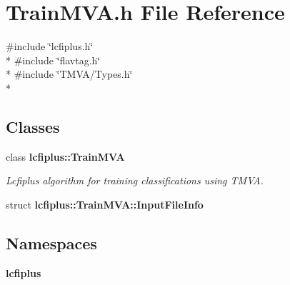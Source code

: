 \section{Train\-M\-V\-A.\-h File Reference}
\label{TrainMVA_8h}
{\ttfamily \#include \char`\"{}lcfiplus.\-h\char`\"{}}\\*
{\ttfamily \#include \char`\"{}flavtag.\-h\char`\"{}}\\*
{\ttfamily \#include \char`\"{}T\-M\-V\-A/\-Types.\-h\char`\"{}}\\*
\subsection*{Classes}
\begin{DoxyCompactItemize}
\item 
class {\bf lcfiplus\-::\-Train\-M\-V\-A}
\begin{DoxyCompactList}\small\item\em Lcfiplus algorithm for training classifications using T\-M\-V\-A. \end{DoxyCompactList}\item 
struct {\bf lcfiplus\-::\-Train\-M\-V\-A\-::\-Input\-File\-Info}
\end{DoxyCompactItemize}
\subsection*{Namespaces}
\begin{DoxyCompactItemize}
\item 
{\bf lcfiplus}
\end{DoxyCompactItemize}
